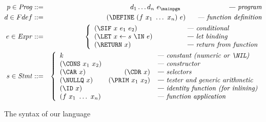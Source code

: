 \begin{figure}[t!]
\footnotesize
\begin{eqnarray*}
   p \in \mathit{Prog} & ::= & d_1 \ldots d_n \,\, e_\mainpgm
    \hspace{7em} \mbox{\em --- program}\\
    d \in Fdef & ::= & (\DEFINE\,\, (f\,\, x_1 \,\, \ldots \,\,x_n)\,\,
    e) 
    \hspace{1.7em} \mbox{\em --- function definition} \\
e \in \mathit{Expr} & ::= &
\left\{\begin{array}{ll@{\hspace{4em}}l}
       (\SIF\,\, x\,\, e_1\,\, e_2) && \mbox{\em --- conditional} \\ 
       (\LET\,\, x \leftarrow s\,\, \IN\,\, e) && \mbox{\em --- let binding} \\
       (\RETURN\,\, x) && \mbox{\em --- return from function}
    \end{array}\right. \\
s \in \mathit{Stmt} & ::= &
\left\{\begin{array}{lr@{\hspace{1em}}l}
       k && \mbox{\em --- constant (numeric or $\NIL$)}\\
       (\CONS\,\, x_1\,\, x_2) && \mbox{\em --- constructor} \\ 
       (\CAR\,\, x) &  (\CDR\,\, x) & \mbox{\em --- selectors} \\ 
       (\NULLQ\,\, x) & (\PRIM\,\, x_1\,\, x_2) & \mbox{\em ---  tester and generic arithmetic} \\ 
       (\ID\,\, x) && \mbox{\em ---  identity function (for inlining)} \\ 
       \multicolumn{2}{l}{(f\,\, x_1\,\,\ldots\,\, x_n)} 
            & \mbox{\em --- function application} 
    \end{array}\right.
\end{eqnarray*}
  \caption{The syntax of our language}\label{fig:lang-syntax}
\figrule
\normalsize
\end{figure}


